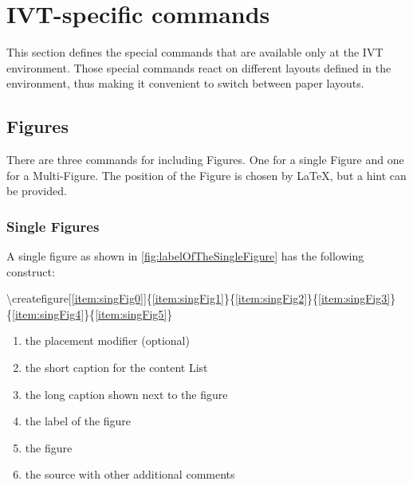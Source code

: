 %
\section{IVT-specific commands}
%

This section defines the
special commands that are available only at the IVT environment.
Those special commands
react on different layouts defined in the environment,
thus making it convenient to switch between paper layouts.

\subsection{Figures} \label{sec:compStructs-Figures}

There are three commands for including Figures. One for a single Figure
and one for a Multi-Figure. The position of the Figure is chosen by
\LaTeX,
but a hint can be provided.

\subsubsection{Single Figures}

\label{sec:compStructs-Figures-SingleFigures}

A single figure as shown in \cref{fig:labelOfTheSingleFigure}
has the following construct:

\textbackslash{}createfigure[\ref{item:singFig0}]\{\ref{item:singFig1}\}\{\ref{item:singFig2}\}\{\ref{item:singFig3}\}\{\ref{item:singFig4}\}\{\ref{item:singFig5}\}
\begin{enumerate}
  \item\label{item:singFig0} the placement modifier (optional)
  \item\label{item:singFig1} the short caption for the content List
  \item\label{item:singFig2} the long caption shown next to the figure
  \item\label{item:singFig3} the label of the figure
  \item\label{item:singFig4} the figure
  \item\label{item:singFig5} the source with other additional comments
\end{enumerate}

